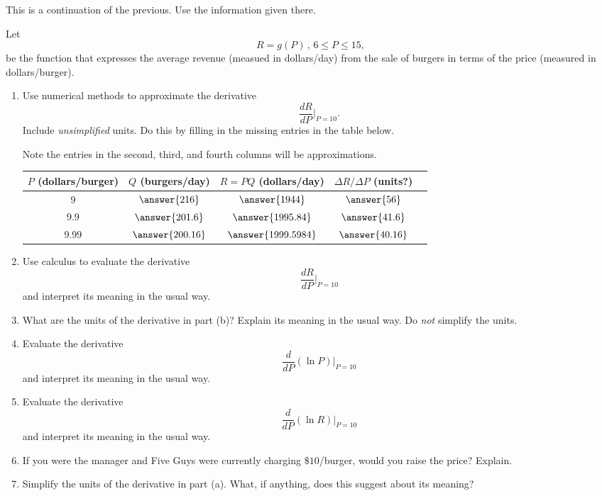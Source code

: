 \documentclass{ximera}
\begin{document}
\begin{question} \label{Qefefrf22}
This is a continuation of the previous. Use the information given there.

Let 
\[
   R = g(P) \, , \, 6\leq P \leq 15,
\]
be the function that expresses the average revenue (measued in dollars/day) from the sale of burgers in terms of the price (measured in dollars/burger).

\begin{enumerate}
\item Use numerical methods to approximate the derivative
\[
 \frac{dR}{dP}\Big|_{P=10}.
\]
Include \emph{unsimplified} units. Do this by filling in the missing entries in the table below.

Note the entries in the second, third, and fourth columns will be approximations.

\begin{center}
  \begin{tabular}{ | c| c | c | c | c |}
    \hline
    $P$ (dollars/burger) & $Q$ (burgers/day) & $R=PQ$ (dollars/day) & $\Delta R/\Delta P$ (units?) \\ \hline
      $9$ & $\answer{216}$ & $\answer{1944}$ &  $\answer{56}$ \\ \hline
    $9.9$ & $\answer{201.6}$ & $\answer{1995.84}$ &  $\answer{41.6}$  \\ \hline
    $9.99$  & $\answer{200.16}$  & $\answer{1999.5984}$  & $\answer{40.16}$   \\ \hline
           \hline
  \end{tabular}
\end{center}

\item Use calculus to evaluate the derivative
\[
       \frac{dR}{dP} \Big|_{P=10}
\]
and interpret its meaning in the usual way.


\item What are the units of the derivative in part (b)? Explain its meaning in the usual way. Do \emph{not} simplify the units.

\item Evaluate the derivative
\[
       \frac{d}{dP} \left( \ln P \right) \Big|_{P=10}
\]
and interpret its meaning in the usual way. 

\item Evaluate the derivative
\[
       \frac{d}{dP} \left( \ln R \right) \Big|_{P=10}
\]
and interpret its meaning in the usual way.


\item If you were the manager and Five Guys were currently charging $\$10$/burger, would you raise the price? Explain.
\begin{freeResponse}
\end{freeResponse}

\item Simplify the units of the derivative in part (a). What, if anything, does this suggest about its meaning?
\begin{freeResponse}
\end{freeResponse}
\end{enumerate}

\end{question}
\end{document}
